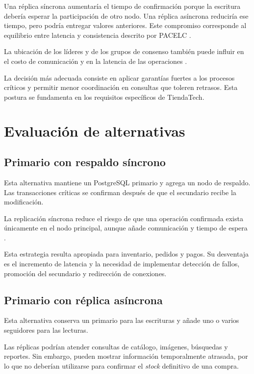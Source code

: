 \documentclass[11pt,a4paper]{article}
\begin{document}
Una réplica síncrona aumentaría el tiempo de confirmación porque la escritura debería esperar la participación de otro nodo. Una réplica asíncrona reduciría ese tiempo, pero podría entregar valores anteriores. Este compromiso corresponde al equilibrio entre latencia y consistencia descrito por PACELC \cite{abadi2012}.

La ubicación de los líderes y de los grupos de consenso también puede influir en el costo de comunicación y en la latencia de las operaciones \cite{ruan2024}.

La decisión más adecuada consiste en aplicar garantías fuertes a los procesos críticos y permitir menor coordinación en consultas que toleren retrasos. Esta postura se fundamenta en los requisitos específicos de TiendaTech.

\section{Evaluación de alternativas}

\subsection{Primario con respaldo síncrono}
Esta alternativa mantiene un PostgreSQL primario y agrega un nodo de respaldo. Las transacciones críticas se confirman después de que el secundario recibe la modificación.

La replicación síncrona reduce el riesgo de que una operación confirmada exista únicamente en el nodo principal, aunque añade comunicación y tiempo de espera \cite{abadi2012,margara2023}.

Esta estrategia resulta apropiada para inventario, pedidos y pagos. Su desventaja es el incremento de latencia y la necesidad de implementar detección de fallos, promoción del secundario y redirección de conexiones.

\subsection{Primario con réplica asíncrona}
Esta alternativa conserva un primario para las escrituras y añade uno o varios seguidores para las lecturas.

Las réplicas podrían atender consultas de catálogo, imágenes, búsquedas y reportes. Sin embargo, pueden mostrar información temporalmente atrasada, por lo que no deberían utilizarse para confirmar el \textit{stock} definitivo de una compra.
\end{document}
